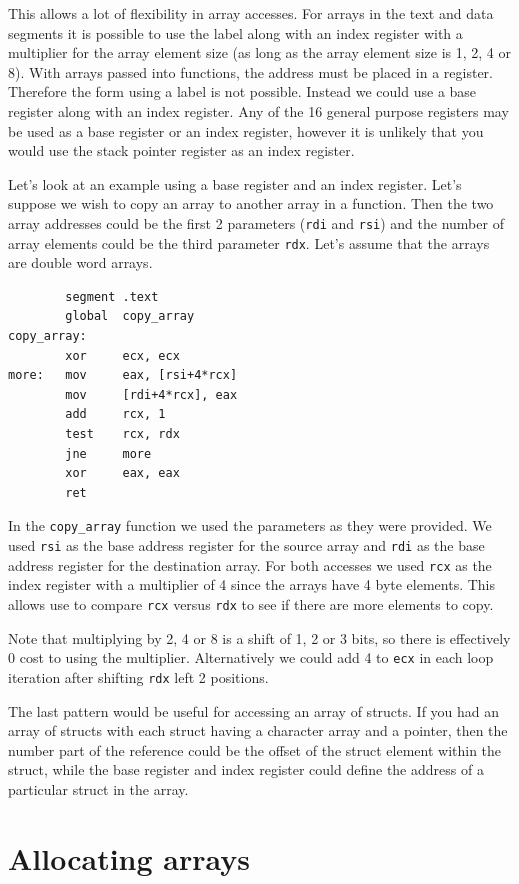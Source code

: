 \documentclass[11pt,b5paper]{book}
\begin{document}
This allows a lot of flexibility in array accesses.
For arrays in the text and data segments it is possible to use the label along with an index register with a multiplier for the 
array element size (as long as the array element size is 1, 2, 4 or 8).
With arrays passed into functions, the address must be placed in a register.
Therefore the form using a label is not possible.
Instead we could use a base register along with an index register.
Any of the 16 general purpose registers may be used as a base register or an index register, however it is unlikely that you would
use the stack pointer register as an index register.

Let's look at an example using a base register and an index register.
Let's suppose we wish to copy an array to another array in a function.
Then the two array addresses could be the first 2 parameters ({\tt rdi} and {\tt rsi}) and the number of array
elements could be the third parameter {\tt rdx}.
Let's assume that the arrays are double word arrays.
\begin{verbatim}
        segment .text
        global  copy_array
copy_array:
        xor     ecx, ecx
more:   mov     eax, [rsi+4*rcx]
        mov     [rdi+4*rcx], eax
        add     rcx, 1
        test    rcx, rdx
        jne     more
        xor     eax, eax
        ret
\end{verbatim}

In the {\tt copy\_array} function we used the parameters as they were provided.
We used {\tt rsi} as the base address register for the source array and
{\tt rdi} as the base address register for the destination array.
For both accesses we used {\tt rcx} as the index register with a multiplier of 4 since the arrays
have 4 byte elements.
This allows use to compare {\tt rcx} versus {\tt rdx} to see if there are more elements to copy.

Note that multiplying by 2, 4 or 8 is a shift of 1, 2 or 3 bits, so there is effectively 0 cost to using
the multiplier.
Alternatively we could add 4 to {\tt ecx} in each loop iteration after shifting {\tt rdx} left 2 positions.

The last pattern would be useful for accessing an array of structs.
If you had an array of structs with each struct having a character array and a pointer, then the number part of the
reference could be the offset of the struct element within the struct, while the base register and index register
could define the address of a particular struct in the array.

\section{Allocating arrays}
\end{document}
